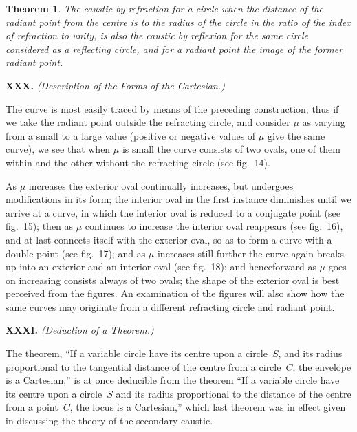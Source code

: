 \documentclass[11pt,a4paper]{book}
\newtheorem*{theorem}{Theorem}
\begin{document}
\begin{center}
\begin{theorem}
The caustic by refraction for a circle when the distance of
the radiant point from the centre is to the radius of the circle
in the ratio of the index of refraction to unity, is also the
caustic by reflexion for the same circle considered as a reflecting
circle, and for a radiant point the image of the former radiant point.
\end{theorem}

\medskip\noindent\textbf{XXX.}
\textit{(Description of the Forms of the Cartesian.)}

The curve is most easily traced by means of the preceding
construction; thus if we take the radiant point outside the
refracting circle, and consider $\mu$ as varying from a small to a
large value (positive or negative values of $\mu$ give the same curve),
we see that when $\mu$ is small the curve consists of two ovals,
one of them within and the other without the refracting circle
(see fig.~14).

As $\mu$ increases the exterior oval continually increases, but
undergoes modifications in its form; the interior oval in the
first instance diminishes until we arrive at a curve, in which
the interior oval is reduced to a conjugate point (see fig.~15);
then as $\mu$ continues to increase the interior oval reappears
(see fig.~16), and at last connects itself with the exterior oval,
so as to form a curve with a double point (see fig.~17);
and as $\mu$ increases still further the curve again breaks up
into an exterior and an interior oval (see fig.~18); and
henceforward as $\mu$ goes on increasing consists always of two ovals;
the shape of the exterior oval is best perceived from the figures.
An examination of the figures will also show how the same
curves may originate from a different refracting circle and radiant point.

\medskip\noindent\textbf{XXXI.}
\textit{(Deduction of a Theorem.)}

The theorem, ``If a variable circle have its centre upon a
circle~$S$, and its radius proportional to the tangential distance
of the centre from a circle~$C$, the envelope is a Cartesian,''
is at once deducible from the theorem ``If a variable circle
have its centre upon a circle~$S$ and its radius proportional to
the distance of the centre from a point~$C$, the locus is a Cartesian,''
which last theorem was in effect given in discussing the theory
of the secondary caustic.


\end{center}
\end{document}
